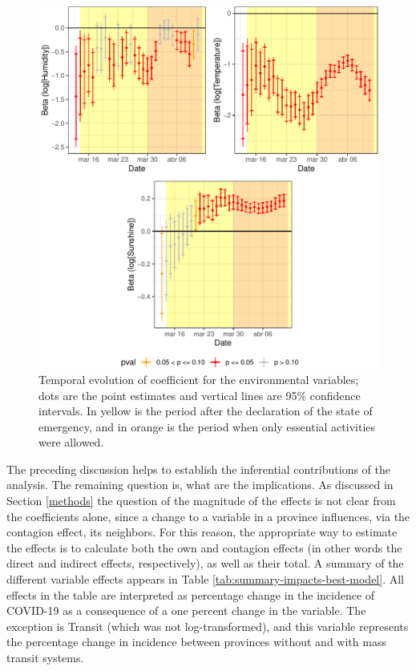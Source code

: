 \documentclass[]{elsarticle} %
\makeatletter
\def\maxwidth{\ifdim\Gin@nat@width>\linewidth\linewidth
\else\Gin@nat@width\fi}
\let\Oldincludegraphics\includegraphics
\renewcommand{\includegraphics}[1]{\Oldincludegraphics[width=\maxwidth]{#1}}
\makeatother
\begin{document}
\begin{figure}
\centering
\includegraphics{Environmental-Correlates-of-COVID19-Spain_files/figure-latex/beta-environmental-time-1.pdf}
\caption{\label{fig:beta-environmental-time}Temporal evolution of
coefficient for the environmental variables; dots are the point
estimates and vertical lines are 95\% confidence intervals. In yellow is
the period after the declaration of the state of emergency, and in
orange is the period when only essential activities were allowed.}
\end{figure}

The preceding discussion helps to establish the inferential
contributions of the analysis. The remaining question is, what are the
implications. As discussed in Section \ref{methods} the question of the
magnitude of the effects is not clear from the coefficients alone, since
a change to a variable in a province influences, via the contagion
effect, its neighbors. For this reason, the appropriate way to estimate
the effects is to calculate both the own and contagion effects (in other
words the direct and indirect effects, respectively), as well as their
total. A summary of the different variable effects appears in Table
\ref{tab:summary-impacts-best-model}. All effects in the table are
interpreted as percentage change in the incidence of COVID-19 as a
consequence of a one percent change in the variable. The exception is
Transit (which was not log-transformed), and this variable represents
the percentage change in incidence between provinces without and with
mass transit systems.
\end{document}
